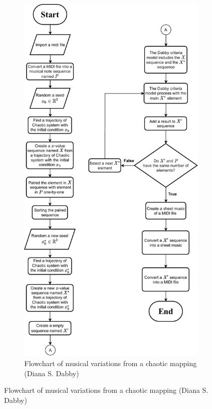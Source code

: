 \documentclass[11pt]{article}
\theoremstyle{definition}
\begin{document}
\iffalse
\begin{figure}
\centering
\begin{subfigure}{0.45\textwidth}
  \centering
  \includegraphics[scale=0.55]{Dabby_process.pdf}
  \caption{Flowchart of musical variations from a chaotic mapping (Diana S. Dabby)}

\end{subfigure}
\end{figure}
\end{document}
